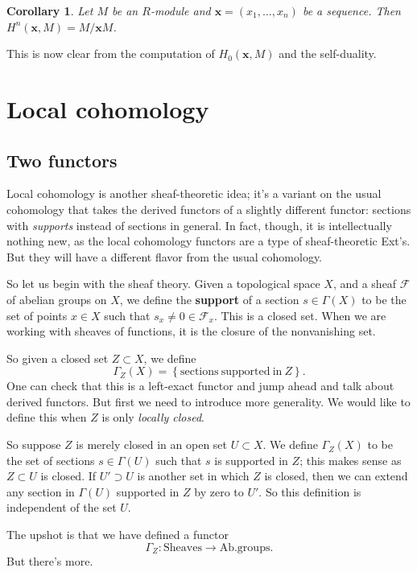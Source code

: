 \documentclass{article}
\newtheorem{corollary}{Corollary}
\begin{document}
\begin{corollary} 
Let $M$ be an $R$-module and $\mathbf{x} = (x_1, \dots, x_n)$ be a sequence.
Then $H^n(\mathbf{x}, M) = M/\mathbf{x}M$.
\end{corollary} 

This is now clear from the computation of $H_0(\mathbf{x}, M)$ and the
self-duality.

\section{Local cohomology}
\subsection{Two functors}

Local cohomology is another sheaf-theoretic idea; it's a variant on the usual
cohomology that takes the derived functors of a slightly different functor:
sections with \emph{supports} instead of sections in general. 
In fact, though, it is intellectually nothing new, as the local cohomology
functors are a type of sheaf-theoretic Ext's. But they will have a different
flavor from the usual cohomology.

So let us begin with the sheaf theory. Given a topological space $X$, and a
sheaf $\mathcal{F}$ of abelian groups on $X$, we define the \textbf{support} of
a section $s \in \Gamma(X)$ to be the set of points $x \in X$ such that $s_x
\neq 
0 \in \mathcal{F}_x$. This is a closed set. When we are working with sheaves of
functions, it is the closure of the nonvanishing set. 

So given a closed set $Z \subset X$, we define
\[ \Gamma_{Z}(X) = \left\{\mathrm{sections \ supported \ in \ }Z\right\}  .\]
One can check that this is a left-exact functor and jump ahead and talk about
derived functors. But first we need to introduce more generality. We would like
to define this when $Z$ is only \emph{locally closed}. 

So suppose $Z$ is merely closed in an open set $U \subset X$. We define
$\Gamma_Z(X)$ to be the set of sections $s \in \Gamma(U)$ such that $s$ is
supported in $Z$; this makes sense as $Z \subset U$ is closed. If $U' \supset U$ is another set in which $Z$ is closed, then
we can extend any section in $\Gamma(U)$ supported in $Z$ by zero to $U'$. So 
this definition is independent of the set $U$. 

The upshot is that we have defined a functor
\[ \Gamma_Z: \mathrm{Sheaves} \to \mathrm{Ab. groups}.  \]
But there's more. 
\end{document}
